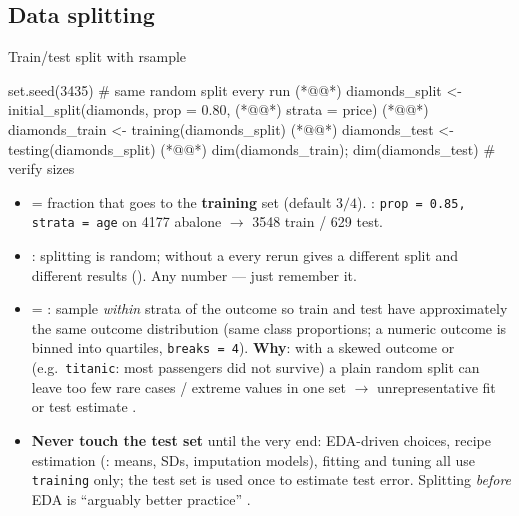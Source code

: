 \subsection{Data splitting}
\begin{topic}{Train/test split with rsample}
\begin{rcode}
set.seed(3435)                # same random split every run  (*@@*)
diamonds_split <- initial_split(diamonds, prop = 0.80,  (*@@*)
                                strata = price)  (*@@*)
diamonds_train <- training(diamonds_split)  (*@@*)
diamonds_test  <- testing(diamonds_split)   (*@@*)
dim(diamonds_train); dim(diamonds_test)     # verify sizes
\end{rcode}
\begin{itemize}
\item {} = fraction that goes to the \textbf{training} set (default $3/4$). : \texttt{prop = 0.85, strata = age} on 4177 abalone $\to$ 3548 train / 629 test.
\item {}: splitting is random; without a  every rerun gives a different split and different results (). Any number --- just remember it.
\item {} = \textbf{}: sample \emph{within} strata of the outcome so train and test have approximately the same outcome distribution (same class proportions; a numeric outcome is binned into quartiles, \texttt{breaks = 4}). \textbf{Why}: with a skewed outcome or  (e.g.\ \texttt{titanic}: most passengers did not survive) a plain random split can leave too few rare cases / extreme values in one set $\to$ unrepresentative fit or test estimate .
\item \textbf{Never touch the test set} until the very end: EDA-driven choices, recipe estimation (: means, SDs, imputation models), fitting and tuning all use \texttt{training} only; the test set is used once to estimate test error. Splitting \emph{before} EDA is ``arguably better practice'' .
\end{itemize}
\end{topic}

